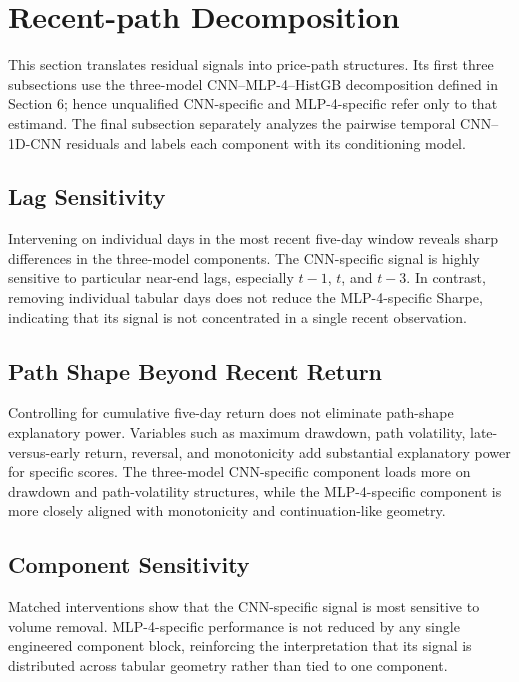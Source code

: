 \section{Recent-path Decomposition}

This section translates residual signals into price-path structures. Its first three subsections use the three-model CNN--MLP-4--HistGB decomposition defined in Section 6; hence unqualified CNN-specific and MLP-4-specific refer only to that estimand. The final subsection separately analyzes the pairwise temporal CNN--1D-CNN residuals and labels each component with its conditioning model.

\subsection{Lag Sensitivity}

Intervening on individual days in the most recent five-day window reveals sharp differences in the three-model components. The CNN-specific signal is highly sensitive to particular near-end lags, especially $t-1$, $t$, and $t-3$. In contrast, removing individual tabular days does not reduce the MLP-4-specific Sharpe, indicating that its signal is not concentrated in a single recent observation.



\subsection{Path Shape Beyond Recent Return}

Controlling for cumulative five-day return does not eliminate path-shape explanatory power. Variables such as maximum drawdown, path volatility, late-versus-early return, reversal, and monotonicity add substantial explanatory power for specific scores. The three-model CNN-specific component loads more on drawdown and path-volatility structures, while the MLP-4-specific component is more closely aligned with monotonicity and continuation-like geometry.



\subsection{Component Sensitivity}

Matched interventions show that the CNN-specific signal is most sensitive to volume removal. MLP-4-specific performance is not reduced by any single engineered component block, reinforcing the interpretation that its signal is distributed across tabular geometry rather than tied to one component.

